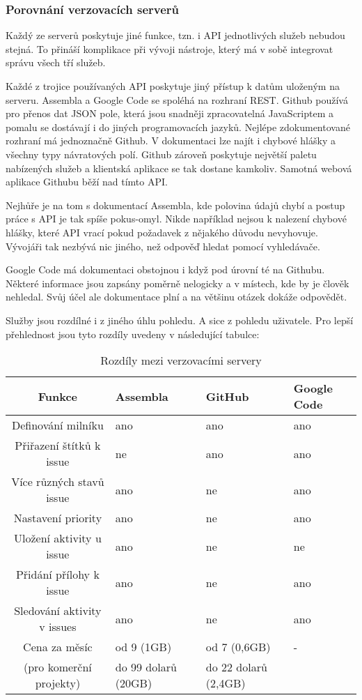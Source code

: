 \subsubsection{Porovnání verzovacích serverů}

Každý ze serverů poskytuje jiné funkce, tzn. i API jednotlivých služeb nebudou stejná. To přináší komplikace při vývoji nástroje, který má v sobě integrovat správu všech tří služeb.

Každé z trojice používaných API poskytuje jiný přístup k datům uloženým na serveru. Assembla a Google Code se spoléhá na rozhraní REST. Github používá pro přenos dat JSON pole, která jsou snadněji zpracovatelná JavaScriptem a pomalu se dostávají i do jiných programovacích jazyků. Nejlépe zdokumentované rozhraní má jednoznačně Github. V dokumentaci lze najít i chybové hlášky a všechny typy návratových polí. Github zároveň poskytuje největší paletu nabízených služeb a klientská aplikace se tak dostane kamkoliv. Samotná webová aplikace Githubu běží nad tímto API.

Nejhůře je na tom s dokumentací Assembla, kde polovina údajů chybí a postup práce s API je tak spíše pokus-omyl. Nikde například nejsou k nalezení chybové hlášky, které API vrací pokud požadavek z nějakého důvodu nevyhovuje. Vývojáři tak nezbývá nic jiného, než odpověď hledat pomocí vyhledávače.

Google Code má dokumentaci obstojnou i když pod úrovní té na Githubu. Některé informace jsou zapsány poměrně nelogicky a v místech, kde by je člověk nehledal. Svůj účel ale dokumentace plní a na většinu otázek dokáže odpovědět.

Služby jsou rozdílné i z jiného úhlu pohledu. A sice z pohledu uživatele. Pro lepší přehlednost jsou tyto rozdíly uvedeny v následující tabulce:

\begin{table}
\begin{center}
	\begin{tabular}{|c||l|l|l|}
	\hline
	Funkce & Assembla & GitHub & Google Code \\
	\hline
	Definování milníku & ano & ano & ano \\
	Přiřazení štítků k issue & ne & ano & ano \\
	Více různých stavů issue & ano & ne & ano \\
	Nastavení priority & ano & ne & ano \\
	Uložení aktivity u issue & ano & ne & ne \\
	Přidání přílohy k issue & ano & ne & ano \\
	Sledování aktivity v issues & ano & ne & ano \\
	\hline
	Cena za měsíc & od 9 (1GB) & od 7 (0,6GB) & - \\
	(pro komerční projekty) & do 99 dolarů (20GB) & do 22 dolarů (2,4GB) & \\
	\hline
	\end{tabular}
\end{center}
\caption{Rozdíly mezi verzovacími servery}
\label{tab:versionSystemsDifference}
\end{table}


